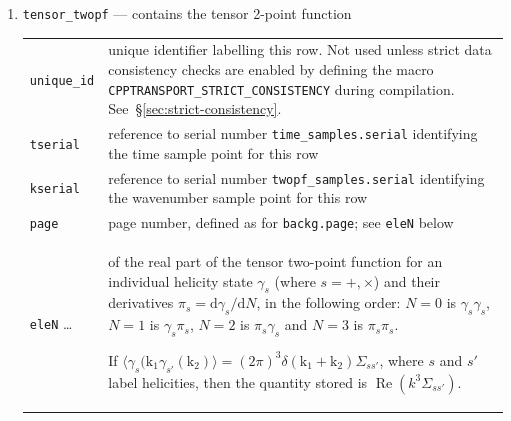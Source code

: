 \documentclass[11pt,a4paper]{article}
\renewcommand{\d}{\mathrm{d}}
\newcommand{\vect}[1]{\bm{\mathrm{{#1}}}}
\newcommand{\semibold}[1]{{\fontseries{b}\selectfont{#1}}}
\newenvironment{sqltablelist}{\renewcommand{\arraystretch}{1.3}\small}{}
\DeclareMathOperator{\realpart}{Re}
\renewcommand{\Re}{\realpart}
\begin{document}
\begin{sqltablelist}
\begin{enumerate}
    \item \texttt{tensor_twopf} --- contains the tensor 2-point function \\
    \label{sqltable:tensor-twopf}
    \begin{tabular}{p{2.5cm}p{11.2cm}}
        \texttt{unique_id} & unique identifier labelling this row. Not used
        unless strict data consistency checks are enabled
        by defining the macro
        \texttt{CPPTRANSPORT_STRICT_CONSISTENCY} during
        compilation. See~\S\ref{sec:strict-consistency}. \\
        \texttt{tserial} & reference to serial number
        \texttt{time_samples.serial} identifying the time sample point for this row \\
        \texttt{kserial} & reference to serial number
        \texttt{twopf_samples.serial} identifying the wavenumber sample point for this row \\
        \texttt{page} & page number, defined as for \texttt{backg.page}; see
        \texttt{eleN} below \\
        \texttt{eleN} \ldots & \semibold{dimensionless components}
        of the real part of the tensor two-point function
        for an individual helicity state $\gamma_s$ (where $s = +, \times$)
        and their derivatives $\pi_s = \d \gamma_s / \d N$,
        in the following order:
        $N = 0$ is $\gamma_s \gamma_s$,
        $N = 1$ is $\gamma_s \pi_s$,
        $N = 2$ is $\pi_s \gamma_s$
        and $N = 3$ is $\pi_s \pi_s$.

        If $\langle \gamma_s(\vect{k}_1 \gamma_{s'}(\vect{k}_2) \rangle =
        (2\pi)^3 \delta(\vect{k}_1 + \vect{k}_2) \Sigma_{ss'}$,
        where $s$ and $s'$ label helicities,
        then the quantity stored is
        $\Re(k^3 \Sigma_{ss'})$.
    \end{tabular}
        

\end{enumerate}
\end{sqltablelist}
\end{document}
